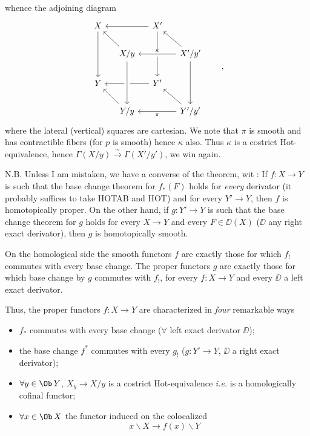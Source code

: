 \noindent{}
whence the adjoining diagram
\[
\begin{tikzcd}[column sep=small]
X \arrow[dd] & & X' \arrow[ll] \arrow[dd] & \\
& X/y \arrow[ul] & & X'/y' \arrow[ll, crossing over, "\kappa"'] \arrow[ul] \arrow[dd] \\
Y & & Y' \arrow[ll] & \\
& Y/y \arrow[ul] \arrow[from=uu, crossing over] & & Y'/y' \arrow[ll, "\pi"] \arrow[ul]
\end{tikzcd}
\qquad ,
\]
where the lateral (vertical) squares are cartesian. We note that $\pi$ is smooth and has contractible fibers (for $p$ is smooth) hence $\kappa$ also. Thus $\kappa$ is a costrict Hot-equivalence, hence $\Gamma(X/y) \overset{\sim}{\longrightarrow} \Gamma(X'/y')$, we win again.

\noindent N.B. Unless I am mistaken, we have a converse of the theorem, wit : If $f : X \to Y$ is such that the base change theorem for $f_*(F)$ holds for \textit{every} derivator (it probably suffices to take \textsf{HOTAB} and \textsf{HOT}) and for every $Y' \to Y$, then $f$ is homotopically proper. On the other hand, if $g : Y' \to Y$ is such that the base change theorem for $g$ holds for every $X \to Y$ and every $F \in \DD(X)$ ($\DD$ any right exact derivator), then $g$ is homotopically smooth. %

\noindent On the homological side the smooth functors $f$ are exactly those for which $f_!$ commutes with every base change. The proper functors $g$ are exactly those for which base change by $g$ commutes with $f_!$, for every $f : X \to Y$ and every $\DD$ a left exact derivator.

\noindent{}
Thus, the proper functors $f : X \to Y$ are characterized in \textit{four} remarkable ways
\begin{itemize}[label={}, leftmargin=0pt, itemindent=2\parindent, labelsep=0.3em]
\item[\textit{a})] $f_*$ commutes with every base change ($\forall$ left exact derivator $\DD$);
\item[\textit{b})] the base change $f^*$ commutes with every $g_!$ ($g : Y' \to Y$, $\DD$ a right exact derivator);
\item[\textit{c})] $\forall y \in \Ob\, Y$, $X_y \to X/y$ is a costrict Hot-equivalence \textit{i.e.} is a homologically cofinal functor;
\item[\textit{d})] $\forall x \in \Ob\, X$ the functor induced on the colocalized
\[
x\backslash X \longrightarrow f(x)\backslash Y
\]
\end{itemize}